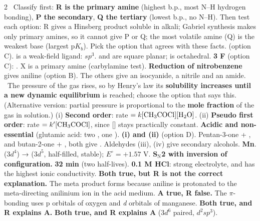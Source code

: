 \documentclass[10pt,a4paper]{extarticle}
\begin{document}
\begin{multicols}{2}\raggedcolumns
\newcommand{\qq}[1]{\textit{\color{black!65}#1}\nl}
\newcommand{\chk}{\ }
\An \chk Classify first: \textbf{R is the primary amine} (highest b.p., most N--H hydrogen bonding), \textbf{P the secondary}, \textbf{Q the tertiary} (lowest b.p., no N--H). Then test each option: R gives a Hinsberg product soluble in alkali; Gabriel synthesis makes only primary amines, so it cannot give P or Q; the most volatile amine (Q) is the weakest base (largest p$K_b$). Pick the option that agrees with these facts.
\An \textbf{} (option C).  is a weak-field ligand: $sp^3$.  and  are square planar;  is octahedral.
\An \textbf{3 F} (option C): .
\An X is a primary amine (carbylamine test). \textbf{Reduction of nitrobenzene} gives aniline (option B). The others give an isocyanide, a nitrile and an amide.
\An \chk The pressure of the gas rises, so by Henry's law its \textbf{solubility increases until a new dynamic equilibrium} is reached; choose the option that says this. (Alternative version: partial pressure is proportional to the \textbf{mole fraction} of the gas in solution.)
\An (i) \textbf{Second order}: rate $=k[\ce{CH3COCl}][\ce{H2O}]$. (ii) \textbf{Pseudo first order}: rate $=k'[\ce{CH3COCl}]$, since [] stays practically constant.
\An \textbf{Acidic and non-essential} (glutamic acid: two , one ).
\An \textbf{(i) and (ii)} (option D). Pentan-3-one + , and butan-2-one + , both give . Aldehydes (iii), (iv) give secondary alcohols.
\An \textbf{Mn}.  ($3d^4$) →  ($3d^5$, half-filled, stable); $E^\circ=+1.57$ V.
\An \textbf{S$_\text{N}$2 with inversion of configuration.}
\An \textbf{32 min} (two half-lives).
\An \textbf{0.1 M HCl}: strong electrolyte, and  has the highest ionic conductivity.
\An \textbf{Both true, but R is not the correct explanation.} The meta product forms because aniline is protonated to the meta-directing anilinium ion in the acid medium.
\An \textbf{A true, R false.} The $\pi$-bonding uses p orbitals of oxygen and \emph{d} orbitals of manganese.
\An \textbf{Both true, and R explains A.}
\An \textbf{Both true, and R explains A} ($3d^6$ paired, $d^2sp^3$).


\end{multicols}
\end{document}
